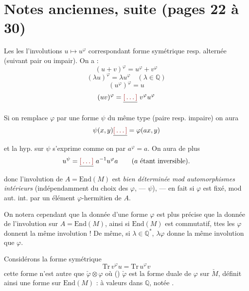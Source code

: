 \documentclass[11pt,a4paper]{article}
\begin{document}
\section*{Notes anciennes, suite (pages 22 à 30)}


Les   les l'involutions
$u \mapsto u^{\varphi}$ correspondant  forme symétrique
resp. alternée (suivant  pair ou impair). On a \ill{} :
\[
(u+v)^{\varphi} = u^{\varphi} + v^{\varphi}
\]
\[
(\lambda u)^{\varphi} = \lambda u^{\varphi} \quad (\lambda \in \mathbb{Q})
\]
\[
(u^{\varphi})^{\varphi} = u
\]
\[
(uv)^{\varphi} = \struck{\ill{}}\ v^{\varphi} u^{\varphi}
\]

Si on remplace $\varphi$ par une forme $\psi$ du même type (paire resp.
impaire) on aura 
\[
\psi(x,y) \struck{\ill{}} = \varphi(ax, y)
\]
et la hyp. sur $\psi$ s'exprime comme on  par
$a^{\varphi} = a$. On aura de plus
\[
u^{\psi} = \struck{\ill{}}\ a^{-1} u^{\varphi} a \qquad (a \text{ étant inversible}).
\]
donc l'involution de $A = \mathrm{End}(M)$ est \emph{bien déterminée mod
automorphismes intérieurs} (indépendamment du choix des $\varphi$, —
$\psi$), — en fait si $\varphi$ est fixé, mod aut. int. par un élément
\struck{\ill{}} $\varphi$-hermitien  de $A$.

On notera cependant que la donnée d'une forme $\varphi$ est plus précise
que la donnée de l'involution sur $A = \mathrm{End}(M)$, ainsi si
$\mathrm{End}(M)$ est commutatif, ttes les $\varphi$ donnent la même
involution ! De même, si $\lambda \in \mathbb{Q}^{*}$, $\lambda\varphi$
donne la même involution que $\varphi$.

Considérons la forme symétrique
\[
\mathrm{Tr}\, v^{\varphi} u = \mathrm{Tr}\, u^{\varphi} v
\]
cette forme n'est autre que $\check\varphi \otimes \varphi$ où
() $\check\varphi$ est la forme duale de $\varphi$ sur $\check M$,
\struck{\ill{}}
définit ainsi une forme sur $\mathrm{End}(M)$ : à valeurs dans
$\mathbb{Q}$, notée \ill{}.
\end{document}
